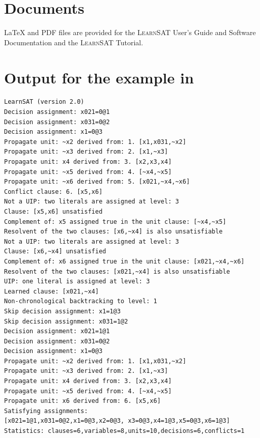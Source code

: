 \documentclass[11pt]{article}
\newcommand*{\ls}{\textsc{LearnSAT}}
\begin{document}
\section{Documents}

\LaTeX{} and PDF files are provided for the \ls{} User's Guide and Software Documentation and the \ls{} Tutorial.




\newpage

\appendix
\section{Output for the example in \cite{mlm}}
\begin{small}
\begin{verbatim}
LearnSAT (version 2.0)
Decision assignment: x021=0@1
Decision assignment: x031=0@2
Decision assignment: x1=0@3
Propagate unit: ~x2 derived from: 1. [x1,x031,~x2]
Propagate unit: ~x3 derived from: 2. [x1,~x3]
Propagate unit: x4 derived from: 3. [x2,x3,x4]
Propagate unit: ~x5 derived from: 4. [~x4,~x5]
Propagate unit: ~x6 derived from: 5. [x021,~x4,~x6]
Conflict clause: 6. [x5,x6]
Not a UIP: two literals are assigned at level: 3
Clause: [x5,x6] unsatisfied
Complement of: x5 assigned true in the unit clause: [~x4,~x5]
Resolvent of the two clauses: [x6,~x4] is also unsatisfiable
Not a UIP: two literals are assigned at level: 3
Clause: [x6,~x4] unsatisfied
Complement of: x6 assigned true in the unit clause: [x021,~x4,~x6]
Resolvent of the two clauses: [x021,~x4] is also unsatisfiable
UIP: one literal is assigned at level: 3
Learned clause: [x021,~x4]
Non-chronological backtracking to level: 1
Skip decision assignment: x1=1@3
Skip decision assignment: x031=1@2
Decision assignment: x021=1@1
Decision assignment: x031=0@2
Decision assignment: x1=0@3
Propagate unit: ~x2 derived from: 1. [x1,x031,~x2]
Propagate unit: ~x3 derived from: 2. [x1,~x3]
Propagate unit: x4 derived from: 3. [x2,x3,x4]
Propagate unit: ~x5 derived from: 4. [~x4,~x5]
Propagate unit: x6 derived from: 6. [x5,x6]
Satisfying assignments:
[x021=1@1,x031=0@2,x1=0@3,x2=0@3, x3=0@3,x4=1@3,x5=0@3,x6=1@3]
Statistics: clauses=6,variables=8,units=10,decisions=6,conflicts=1
\end{verbatim}
\end{small}
\end{document}
